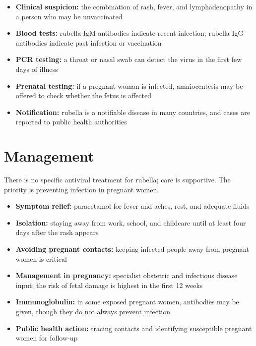 \begin{itemize}
    \item \textbf{Clinical suspicion:} the combination of rash, fever, and lymphadenopathy in a person who may be unvaccinated
    \item \textbf{Blood tests:} rubella IgM antibodies indicate recent infection; rubella IgG antibodies indicate past infection or vaccination
    \item \textbf{PCR testing:} a throat or nasal swab can detect the virus in the first few days of illness
    \item \textbf{Prenatal testing:} if a pregnant woman is infected, amniocentesis may be offered to check whether the fetus is affected
    \item \textbf{Notification:} rubella is a notifiable disease in many countries, and cases are reported to public health authorities
\end{itemize}

\section*{Management}
There is no specific antiviral treatment for rubella; care is supportive. The priority is preventing infection in pregnant women.

\begin{itemize}
    \item \textbf{Symptom relief:} paracetamol for fever and aches, rest, and adequate fluids
    \item \textbf{Isolation:} staying away from work, school, and childcare until at least four days after the rash appears
    \item \textbf{Avoiding pregnant contacts:} keeping infected people away from pregnant women is critical
    \item \textbf{Management in pregnancy:} specialist obstetric and infectious disease input; the risk of fetal damage is highest in the first 12 weeks
    \item \textbf{Immunoglobulin:} in some exposed pregnant women, antibodies may be given, though they do not always prevent infection
    \item \textbf{Public health action:} tracing contacts and identifying susceptible pregnant women for follow-up
\end{itemize}

